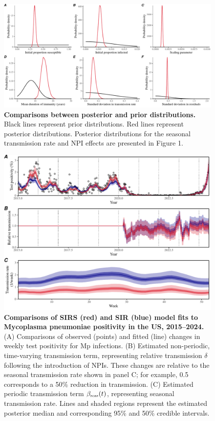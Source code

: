 \documentclass[12pt]{article}
\newcommand{\tsub}[2]{#1_{{\textrm{\tiny #2}}}}
\begin{document}
\pagebreak

\begin{figure}[!ht]
\includegraphics[width=\textwidth]{../figure1/figure1_posterior.pdf}
\caption{
\textbf{Comparisons between posterior and prior distributions.}
Black lines represent prior distributions.
Red lines represent posterior distributions.
Posterior distributions for the seasonal transmission rate and NPI effects are presented in Figure 1.
}
\end{figure}


\pagebreak

\begin{figure}[!ht]
\includegraphics[width=\textwidth]{../figure_sirs/figure_sirs_fit.pdf}
\caption{
\textbf{Comparisons of SIRS (red) and SIR (blue) model fits to Mycoplasma pneumoniae positivity in the US, 2015--2024.}
(A) Comparisons of observed (points) and fitted (line) changes in weekly test positivity for Mp infections.
(B) Estimated non-periodic, time-varying transmission term, representing relative transmission $\delta$ following the introduction of NPIs.
These changes are relative to the seasonal transmission rate shown in panel C;
for example, 0.5 corresponds to a 50\% reduction in transmission.
(C) Estimated periodic transmission term  $\tsub{\beta}{seas}(t)$, representing seasonal transmission rate.
Lines and shaded regions represent the estimated posterior median and corresponding 95\% and 50\% credible intervals.
}
\end{figure}

\pagebreak


\end{document}
